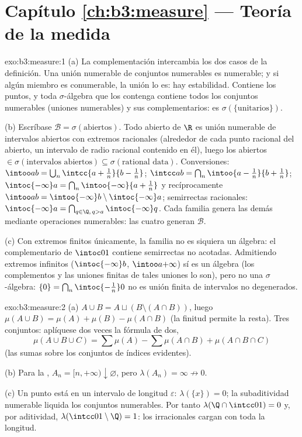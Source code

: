 \section*{Capítulo \ref{ch:b3:measure} --- Teoría de la medida}

\begin{solution}{exo:b3:measure:1}
(a) La complementación intercambia los dos casos de la definición. Una
unión numerable de conjuntos numerables es numerable; y si algún miembro
es conumerable, la unión lo es: hay estabilidad. Contiene los puntos, y
toda $\sigma$-álgebra que los contenga contiene todos los conjuntos
numerables (uniones numerables) y sus complementarios: es
$\sigma(\{\text{unitarios}\})$.

(b) Escríbase $\mathcal B = \sigma(\text{abiertos})$. Todo abierto de $\R$
es unión numerable de intervalos abiertos con extremos racionales
(alrededor de cada punto racional del
abierto, un intervalo de radio
racional contenido en él), luego los abiertos $\in
\sigma(\text{intervalos abiertos}) \subseteq \sigma(\text{rational
data})$. Conversiones: $\intoo ab = \bigcup_n\intcc{a +
\frac1n}{b - \frac1n}$; $\intcc ab = \bigcap_n \intoo{a -
\frac1n}{b + \frac1n}$; $\intoc{-\infty}a = \bigcap_n
\intoo{-\infty}{a + \frac1n}$ y recíprocamente $\intoo ab =
\intoo{-\infty}b \setminus \intoc{-\infty}a$; semirrectas racionales:
$\intoc{-\infty}a =
\bigcap_{q \in \Q,\, q > a}\intoc{-\infty}q$. Cada familia genera las
demás mediante operaciones numerables: las cuatro generan
$\mathcal B$.

(c) Con extremos finitos únicamente, la familia no es siquiera un
álgebra: el complementario de $\intoc01$ contiene semirrectas no
acotadas. Admitiendo extremos infinitos ($\intoc{-\infty}b$, $\intoo
a{+\infty}$) sí es un álgebra (los complementos y las uniones finitas de
tales uniones lo son), pero no una $\sigma$-álgebra:
$\{0\} = \bigcap_n\intoc{-\frac1n}0$ no es unión finita de intervalos no
degenerados.
\end{solution}

\begin{solution}{exo:b3:measure:2}
(a) $A \cup B = A \sqcup (B \setminus (A\cap B))$, luego
$\mu(A\cup B) = \mu(A) + \mu(B) - \mu(A\cap B)$ (la finitud permite la
resta). Tres conjuntos: aplíquese dos veces la fórmula de dos,
\[
\mu(A\cup B\cup C) = \sum\mu(A) - \sum\mu(A\cap B) +
\mu(A\cap B\cap C)
\]
(las sumas sobre los conjuntos de índices evidentes).

(b) Para la ,
$A_n = [n, +\infty) \downarrow
\varnothing$, pero $\lambda(A_n) = \infty \not\to 0$.

(c) Un punto está en un intervalo de longitud $\varepsilon$:
$\lambda(\{x\}) = 0$; la subaditividad numerable liquida los conjuntos
numerables. Por tanto $\lambda(\Q \cap \intcc01) = 0$ y, por aditividad,
$\lambda(\intcc01\setminus\Q) = 1$: los irracionales cargan con toda la
longitud.
\end{solution}

